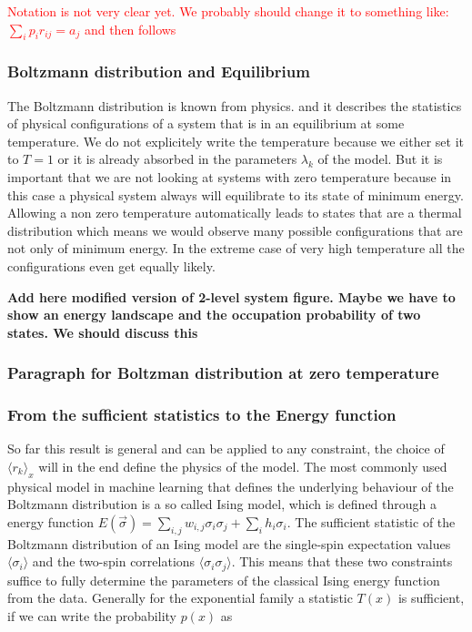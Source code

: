 \documentclass[nofootinbib, superscriptaddress, prl]{revtex4}
\begin{document}
\textcolor{red}{Notation is not very clear yet. We probably should change it to something like: $\sum_i p_i r_{ij} = a_j$ and then follows }

\subsubsection{Boltzmann distribution and Equilibrium}

The Boltzmann distribution is known from physics.
and it describes the statistics of physical configurations of a system that is in an equilibrium at some temperature. We do not explicitely write the temperature because we either set it to $T=1$ or it is already absorbed in the parameters $\lambda_k$ of the model. But it is important that we are not looking at systems with zero temperature because in this case a physical system always will equilibrate to its state of minimum energy. Allowing a non zero temperature automatically leads to states that are a thermal distribution which means we would observe many possible configurations that are not only of minimum energy. In the extreme case of very high temperature all the configurations even get equally likely.  

\textbf{Add here modified version of 2-level system figure. Maybe we have to show an energy landscape and the occupation probability of two states. We should discuss this}

\subsubsection{Paragraph for Boltzman distribution at zero temperature}

\subsubsection{From the sufficient statistics to the Energy function}

So far this result is general and can be applied to any constraint, the choice of $\langle r_k \rangle_x$ will in the end define the physics of the model. The most commonly used physical model in machine learning that defines the underlying behaviour of the Boltzmann distribution is a so called Ising model, which is defined through a energy function $E(\vec {\sigma}) = \sum_{i,j} w_{i,j} \sigma_i \sigma_j + \sum_i h_i \sigma_i$. 
The sufficient statistic of the Boltzmann distribution of an Ising model are the single-spin expectation values $\langle \sigma_i \rangle$ and the two-spin correlations $\langle \sigma_i \sigma_j \rangle$. This means that these two constraints suffice to fully determine the parameters of the classical Ising energy function from the data.
Generally for the exponential family a statistic $T(x)$ is sufficient, if we can write the probability $p(x)$ as
\end{document}
